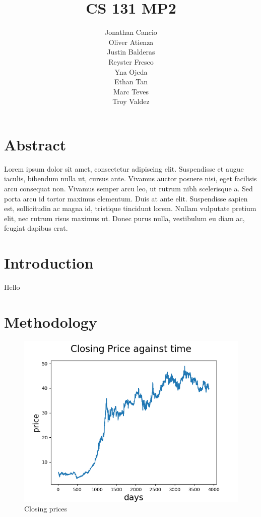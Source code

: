\documentclass[8pt]{article}
\begin{document}
	\author{Jonathan Cancio \\ Oliver Atienza \\ Justin Balderas \\ 
	Reyster Fresco \\ Yna Ojeda \\ Ethan Tan \\ Marc Teves \\ Troy Valdez}
	\title{CS 131 MP2}
	\maketitle
	\section{Abstract}
	Lorem ipsum dolor sit amet, consectetur adipiscing elit. Suspendisse et augue iaculis, bibendum nulla ut, cursus ante. Vivamus auctor posuere nisi, eget facilisis arcu consequat non. Vivamus semper arcu leo, ut rutrum nibh scelerisque a. Sed porta arcu id tortor maximus elementum. Duis at ante elit. Suspendisse sapien est, sollicitudin ac magna id, tristique tincidunt lorem. Nullam vulputate pretium elit, nec rutrum risus maximus ut. Donec purus nulla, vestibulum eu diam ac, feugiat dapibus erat. 
	\section{Introduction}
	Hello\cite{heath}
	\section{Methodology}

	\begin{figure}[h]
		\centering
		\includegraphics{ap_closing_price.png}
		\caption{Closing prices}
		\label{fig:close_price_graph}
	\end{figure}
\end{document}
